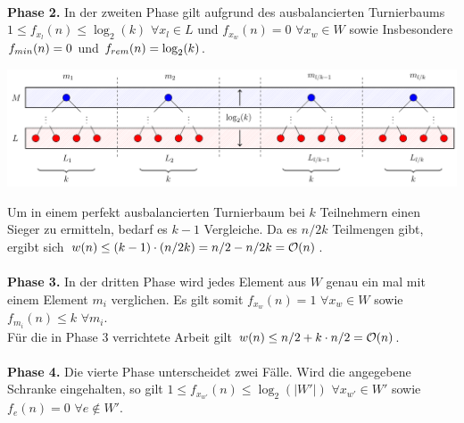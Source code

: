 \noindent\makebox[\linewidth]{\color{gray}{\hdashrule[0.5ex]{\linewidth}{0.5pt}{1.5mm}}}\\[.05cm]
\noindent
\begin{minipage}[Ht]{.34\textwidth}
\textbf{Phase 2.} In der zweiten Phase gilt aufgrund des ausbalancierten Turnierbaums $1 \leq f_{x_l}(n)\leq \log_2(k)$ $\forall x_l\in L$ und $f_{x_w}(n)=0$ $\forall x_w\in W$ sowie Insbesondere $f_{min}(n) = 0$ und $f_{rem}(n) = \log_2(k)$.\\[.15cm]
\end{minipage}%
%
\hfill
%
\begin{minipage}[Ht]{.64\textwidth}
        \centering
        \includegraphics[scale=0.5]{snippets/tikz/min_p2.pdf}
        \vspace*{-10mm}
        \label{fig: min_p1}
\end{minipage}
%
\noindent
Um in einem perfekt ausbalancierten Turnierbaum bei $k$ Teilnehmern einen Sieger zu ermitteln, bedarf es $k-1$ Vergleiche. Da es $n/2k$ Teilmengen gibt, ergibt sich $w(n)\leq (k-1)\cdot (n/2k) = n/2 - n/2k = \mathcal{O}(n)$.\\[.05cm]
\noindent\makebox[\linewidth]{\color{gray}{\hdashrule[0.5ex]{\linewidth}{0.5pt}{1.5mm}}}\\[.05cm]
\noindent
\textbf{Phase 3.} In der dritten Phase wird jedes Element aus $W$ genau ein mal mit einem Element $m_i$ verglichen. Es gilt somit $f_{x_w}(n)=1$ $\forall x_w\in W$ sowie $f_{m_i}(n)\leq k$ $\forall m_i$.\\
Für die in Phase 3 verrichtete Arbeit gilt $w(n)\leq n/2 + k\cdot n/2=\mathcal{O}(n)$.\\[.05cm]
\noindent\makebox[\linewidth]{\color{gray}{\hdashrule[0.5ex]{\linewidth}{0.5pt}{1.5mm}}}\\[.05cm]
\noindent
\textbf{Phase 4.} Die vierte Phase unterscheidet zwei Fälle. Wird die angegebene Schranke eingehalten, so gilt $1\leq f_{x_{w'}}(n)\leq \log_2(|W'|)$ $\forall x_{w'}\in W'$ sowie $f_e(n)=0$ $\forall e\notin W'$.\\
